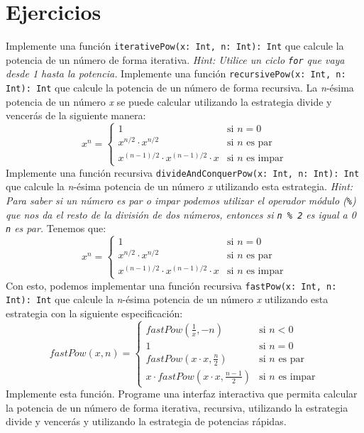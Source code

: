 \newpage
\section{Ejercicios}
  \begin{Exercise}[title={Potencias}]
    \Question Implemente una función \texttt{iterativePow(x: Int, n: Int): Int} que calcule la 
      potencia de un número de forma iterativa.
      \textit{Hint: Utilice un ciclo \texttt{for} que vaya desde 1 hasta la potencia.}
    \Question Implemente una función \texttt{recursivePow(x: Int, n: Int): Int} que calcule la 
      potencia de un número de forma recursiva.
    \Question La \textit{n}-ésima potencia de un número \textit{x} se puede calcular utilizando la estrategia
      divide y vencerás de la siguiente manera:
      \[
        x^n = \begin{cases}
          1 & \text{si } n = 0 \\
          x^{n / 2} \cdot x^{n / 2} & \text{si } n \text{ es par} \\
          x^{(n - 1) / 2} \cdot x^{(n - 1) / 2} \cdot x & \text{si } n \text{ es impar}
        \end{cases}
      \]
      Implemente una función recursiva \texttt{divideAndConquerPow(x: Int, n: Int): Int} que
      calcule la \textit{n}-ésima potencia de un número \textit{x} utilizando esta estrategia.
      \textit{Hint: Para saber si un número es par o impar podemos utilizar el operador módulo 
      (\texttt{\%}) que nos da el resto de la división de dos números, entonces si \texttt{n \% 2} es
      igual a 0 \texttt{n} es par.}
    \Question Tenemos que:
        \[  x^n = \begin{cases}
              1 & \text{si } n = 0 \\
              x^{n / 2} \cdot x^{n / 2} & \text{si } n \text{ es par} \\
              x^{(n - 1) / 2} \cdot x^{(n - 1) / 2} \cdot x & \text{si } n \text{ es impar}
            \end{cases} 
          \]
        Con esto, podemos implementar una función recursiva \texttt{fastPow(x: Int, n: Int): Int} 
        que calcule la \textit{n}-ésima potencia de un número \textit{x} utilizando esta estrategia
        con la siguiente especificación:
        \[  
          \mathit{fastPow}(x, n) = \begin{cases}
            \mathit{fastPow}(\frac{1}{x}, -n) & \text{si } n < 0 \\
            1 & \text{si } n = 0 \\
            \mathit{fastPow}\left(x \cdot x, \frac{n}{2}\right) & \text{si } n \text{ es par} \\
            x \cdot \mathit{fastPow}\left(x \cdot x, \frac{n - 1}{2}\right) & \text{si } n \text{ es impar}
          \end{cases}
        \]
        Implemente esta función.
    \Question Programe una interfaz interactiva que permita calcular la potencia de un número de 
      forma iterativa, recursiva, utilizando la estrategia divide y vencerás y utilizando la 
      estrategia de potencias rápidas.
  \end{Exercise}

